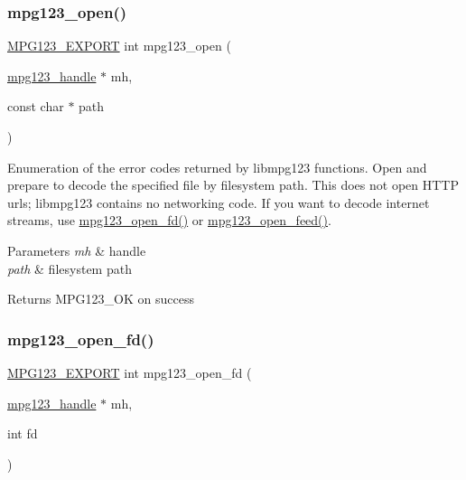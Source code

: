 \subsubsection{\texorpdfstring{mpg123\_open()}{mpg123\_open()}}
{\footnotesize\ttfamily \mbox{\hyperlink{mpg123_8h_a2ba98cfba3f760879df70e755b2a61cc}{M\+P\+G123\+\_\+\+E\+X\+P\+O\+RT}} int mpg123\+\_\+open (\begin{DoxyParamCaption}\item[{\mbox{\hyperlink{group__mpg123__init_ga6728e2839a395f3a07d4514da659faca}{mpg123\+\_\+handle}} $\ast$}]{mh,  }\item[{const char $\ast$}]{path }\end{DoxyParamCaption})}

Enumeration of the error codes returned by libmpg123 functions. Open and prepare to decode the specified file by filesystem path. This does not open H\+T\+TP urls; libmpg123 contains no networking code. If you want to decode internet streams, use \mbox{\hyperlink{group__mpg123__input_ga969c0cbe49b3831e18ad9e9e45c9d83e}{mpg123\+\_\+open\+\_\+fd()}} or \mbox{\hyperlink{group__mpg123__input_ga072669ae9bde29eea8cffa4be10c7345}{mpg123\+\_\+open\+\_\+feed()}}. 
\begin{DoxyParams}{Parameters}
{\em mh} & handle \\
\hline
{\em path} & filesystem path \\
\hline
\end{DoxyParams}
\begin{DoxyReturn}{Returns}
M\+P\+G123\+\_\+\+OK on success 
\end{DoxyReturn}
\mbox{\label{group__mpg123__input_ga969c0cbe49b3831e18ad9e9e45c9d83e}} 
\subsubsection{\texorpdfstring{mpg123\_open\_fd()}{mpg123\_open\_fd()}}
{\footnotesize\ttfamily \mbox{\hyperlink{mpg123_8h_a2ba98cfba3f760879df70e755b2a61cc}{M\+P\+G123\+\_\+\+E\+X\+P\+O\+RT}} int mpg123\+\_\+open\+\_\+fd (\begin{DoxyParamCaption}\item[{\mbox{\hyperlink{group__mpg123__init_ga6728e2839a395f3a07d4514da659faca}{mpg123\+\_\+handle}} $\ast$}]{mh,  }\item[{int}]{fd }\end{DoxyParamCaption})}

